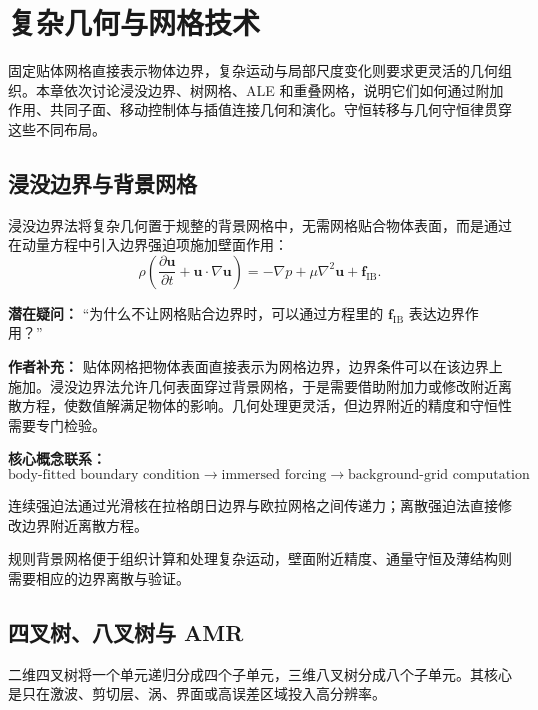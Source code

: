 \chapter{复杂几何与网格技术}\label{ch:21}
\begin{chaptersummary}
固定贴体网格直接表示物体边界，复杂运动与局部尺度变化则要求更灵活的几何组织。本章依次讨论浸没边界、树网格、ALE 和重叠网格，说明它们如何通过附加作用、共同子面、移动控制体与插值连接几何和演化。守恒转移与几何守恒律贯穿这些不同布局。
\end{chaptersummary}
\section{浸没边界与背景网格}
浸没边界法将复杂几何置于规整的背景网格中，无需网格贴合物体表面，而是通过在动量方程中引入边界强迫项施加壁面作用：
\[
\rho\left(
\frac{\partial\bm u}{\partial t}
+\bm u\cdot\nabla\bm u
\right)
=
-\nabla p+\mu\nabla^2\bm u+\bm f_{\mathrm{IB}}.
\]

\begin{authornote}
\textbf{潜在疑问：}
“为什么不让网格贴合边界时，可以通过方程里的 \(\bm f_{\mathrm{IB}}\) 表达边界作用？”

\textbf{作者补充：}
贴体网格把物体表面直接表示为网格边界，边界条件可以在该边界上施加。浸没边界法允许几何表面穿过背景网格，于是需要借助附加力或修改附近离散方程，使数值解满足物体的影响。几何处理更灵活，但边界附近的精度和守恒性需要专门检验。

\textbf{核心概念联系：}
\[
\text{body-fitted boundary condition}
\longrightarrow
\text{immersed forcing}
\longrightarrow
\text{background-grid computation}
\]
\end{authornote}

连续强迫法通过光滑核在拉格朗日边界与欧拉网格之间传递力；离散强迫法直接修改边界附近离散方程。

规则背景网格便于组织计算和处理复杂运动，壁面附近精度、通量守恒及薄结构则需要相应的边界离散与验证。

\section{四叉树、八叉树与 AMR}
二维四叉树将一个单元递归分成四个子单元，三维八叉树分成八个子单元。其核心是只在激波、剪切层、涡、界面或高误差区域投入高分辨率。

